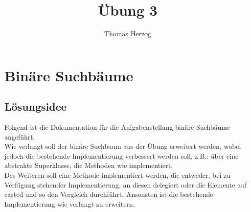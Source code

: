 \documentclass[11pt, a4paper, twoside]{article}   	%
\title{Übung 3}
\author{Thomas Herzog}
\newcommand{\ideaSection}{Lösungsidee}
\begin{document}
\setlength{\headheight}{15mm}

{\color{myred}
	\section
		{Binäre Suchbäume}
}

\subsection{\ideaSection}
Folgend ist die Dokumentation für die Aufgabenstellung binäre Suchbäume angeführt. \\
Wie verlangt soll der binäre Suchbaum aus der Übung erweitert werden, wobei jedoch die bestehende Implementierung verbessert werden soll, z.B.: über eine abstrakte Superklasse, die Methoden wie  implementiert.\\
Des Weiteren soll eine Methode  implementiert werden, die entweder, bei zu Verfügung stehender  Implementierung, an diesen delegiert oder die Elemente auf  casted und so den Vergleich durchführt.
Ansonsten ist die bestehende Implementierung wie verlangt zu erweitern.\\
\end{document}
